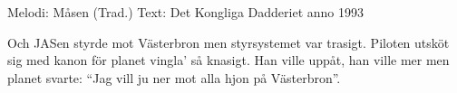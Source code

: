 \begin{song}

\begin{songmeta}
Melodi: Måsen (Trad.)
Text: Det Kongliga Dadderiet anno 1993
\end{songmeta}

\begin{songtext}
Och JASen styrde mot Västerbron
men styrsystemet var trasigt.
Piloten utsköt sig med kanon
för planet vingla' så knasigt.
Han ville uppåt, han ville mer
men planet svarte: \textquotedblleft{}Jag vill ju ner
mot alla hjon
på Västerbron\textquotedblright{}.
\end{songtext}

\end{song}
